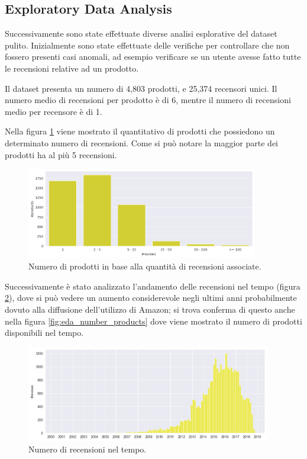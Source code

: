 \subsection{Exploratory Data Analysis}
Successivamente sono state effettuate diverse analisi esplorative del dataset pulito.
Inizialmente sono state effettuate delle verifiche per controllare che non fossero presenti casi anomali, ad esempio verificare se un utente avesse fatto tutte le recensioni relative ad un prodotto.

Il dataset presenta un numero di 4,803 prodotti, e 25,374 recensori unici. Il numero medio di recensioni per prodotto è di 6, mentre il numero di recensioni medio per recensore è di 1.

Nella figura \ref{fig:eda_nreviews} viene mostrato il quantitativo di prodotti che possiedono un determinato numero di recensioni. Come si può notare la maggior parte dei prodotti ha al più 5 recensioni.

\begin{figure}[ht]
    \centering
    \includegraphics[width=0.9\textwidth]{images/eda/eda_reviews_product_number.png}
    \caption{Numero di prodotti in base alla quantità di recensioni associate.}
    \label{fig:eda_nreviews}
\end{figure}

Successivamente è stato analizzato l'andamento delle recensioni nel tempo (figura \ref{fig:eda_reviews_distribution}), dove si può vedere un aumento considerevole negli ultimi anni probabilmente dovuto alla diffusione dell'utilizzo di Amazon; si trova conferma di questo anche nella figura \ref{fig:eda_number_products} dove viene mostrato il numero di prodotti disponibili nel tempo.

\begin{figure}[ht]
    \centering
    \includegraphics[width=0.95\textwidth]{images/eda/eda_distribuiont_reviews.png}
    \caption{Numero di recensioni nel tempo.}
    \label{fig:eda_reviews_distribution}
\end{figure}

